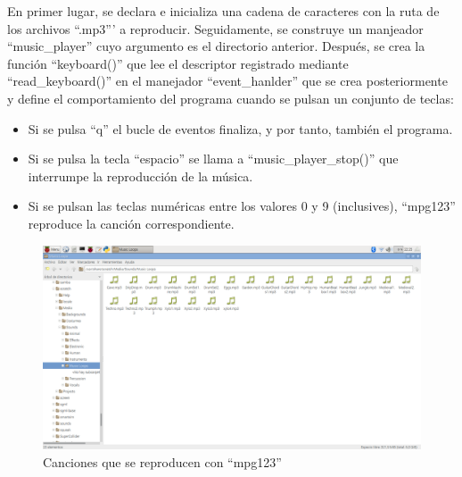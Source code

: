 \begin{itemize}
    
    En primer lugar, se declara e inicializa una cadena de caracteres con la ruta de los archivos ``.mp3''' a reproducir. Seguidamente, se construye un manjeador ``music\_player'' cuyo argumento es el directorio anterior. Después, se crea la función ``keyboard()'' que lee el descriptor registrado mediante ``read\_keyboard()'' en el manejador ``event\_hanlder'' que se crea posteriormente y define el comportamiento del programa cuando se pulsan un conjunto de teclas:
    
    \begin{itemize}
        \item Si se pulsa ``q'' el bucle de eventos finaliza, y por tanto, también el programa.
        \item Si se pulsa la tecla ``espacio'' se llama a ``music\_player\_stop()'' que interrumpe la reproducción de la música.
        \item Si se pulsan las teclas numéricas entre los valores 0 y 9 (inclusives), ``mpg123'' reproduce la canción correspondiente.
    \end{itemize}
    
    \begin{figure}[H]
    \centering
    \includegraphics[scale = 0.25]{anexo_a/figuras_dir/musica.jpg}
    \caption{Canciones que se reproducen con ``mpg123''}
    \end{figure}
  
\end{itemize}
